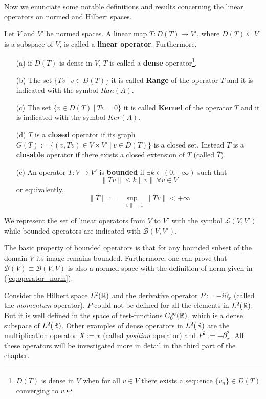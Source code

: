 Now we enunciate some notable definitions and results concerning the linear operators on normed and Hilbert spaces. 
 \begin{definition}
 	Let $V$ and $V'$ be normed spaces. A linear map $T:D(T)\to V'$, where $D(T)\subseteq V$ is a subspace of $V$, is called a \textbf{linear operator}. Furthermore,
 	\begin{itemize}
 		\item[(a)] if $D(T)$ is dense in $V$, $T$ is called a \textbf{dense} operator\footnote{$D(T)$ is dense in $V$ when for all $v\in V$ there exists a sequence $\{v_n\}\in D(T)$ converging to $v$.}.
 		\item[(b)] The set $\{Tv\ |\ v\in D(T) \}$ it is called \textbf{Range} of the operator $T$ and it is indicated with the symbol $Ran(A)$.
 		\item[(c)] The set $\{v\in D(T)\ |\ Tv=0\}$ it is called \textbf{Kernel} of the operator $T$ and it is indicated with the symbol $Ker(A)$.
 		\item[(d)] $T$ is a \textbf{closed} operator if its graph $G(T):=\{(v,Tv)\in V\times V'\ |\ v\in D(T)\}$ is a closed set. Instead $T$ is a \textbf{closable} operator if there exists a closed extension of $T$ (called $\overline{T}$).
 		\item[(e)] An operator $T:V\to V'$ is \textbf{bounded} if $\exists k\in(0,+\infty)$ such that
 		\begin{equation}
 				\|Tv\|\le k\|v\|\ \forall v\in V
 		\end{equation}
 		or equivalently,
 		\begin{equation}
 			\|T\|:=\sup_{\|v\|=1}\|Tv\|<+\infty
 				\label{eq:operator_norm}
 		\end{equation}
 	\end{itemize}
 	We represent the set of linear operators from $V$ to $V'$ with the symbol $\mathcal{L}(V,V')$ while bounded operators are indicated with $\mathcal{B}(V,V')$.
 \end{definition}
 
 \begin{oss}
 The basic property of bounded operators is that for any bounded subset of the domain $V$ its image remains bounded. Furthermore, one can prove that $\mathcal{B}(V)\equiv\mathcal{B}(V,V)$ is also a normed space with the definition of norm given in (\ref{eq:operator_norm}).  
 \end{oss}
 
 \begin{example}
 	\label{ex:momentum_op}
 	Consider the Hilbert space $L^2({\mathbb R})$ and the derivative operator $P:=-i\partial_x$ (called the \textit{momentum} operator). $P$ could not be defined for all the elements in $L^2({\mathbb R})$. But it is well defined in the space of test-functions $C^\infty_0({\mathbb R})$, which is a dense subspace of $L^2({\mathbb R})$. Other examples of dense operators in $L^2({\mathbb R})$ are the multiplication operator $X:=x$ (called \textit{position} operator) and $P^2:=-\partial_x^2$. All these operators will be investigated more in detail in the third part of the chapter.
 \end{example}



